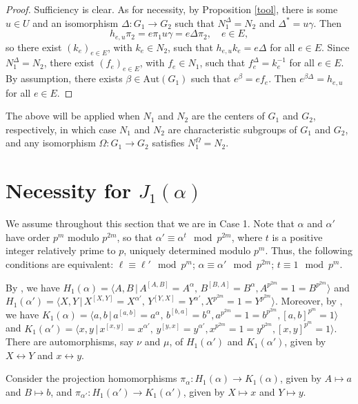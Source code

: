 \documentclass{amsart}
\theoremstyle{definition}
\theoremstyle{remark}
\begin{document}
\begin{proof} Sufficiency is clear. As for necessity, by Proposition \ref{tool}, there is some $u\in U$
and an isomorphism $\Delta:G_1\to G_2$ such that $N_1^\Delta=N_2$ and $\Delta^*=u\gamma$. Then
$$
h_{e,u}\pi_2=e \pi_1 u\gamma=e\Delta\pi_2,\quad e\in E,
$$
so there exist $(k_e)_{e\in E}$, with $k_e\in N_2$, such that $h_{e,u}k_e=e\Delta$ for all $e\in E$. Since $N_1^\Delta=N_2$,
there exist $(f_e)_{e\in E}$, with $f_e\in N_1$, such that $f_e^\Delta=k_e^{-1}$ for all $e\in E$. By assumption, there
exists $\beta\in \mathrm{Aut}(G_1)$ such that $e^\beta=e f_e$. Then $e^{\beta\Delta}=h_{e,u}$ for all $e\in E$.
\end{proof}


The above will be applied when $N_1$ and $N_2$ are the centers of $G_1$ and $G_2$, respectively,
in which case $N_1$ and $N_2$ are characteristic subgroups of $G_1$ and $G_2$, and any isomorphism
$\Omega:G_1\to G_2$ satisfies $N_1^\Omega=N_2$.


\section{Necessity for $J_1(\alpha)$}\label{caso1}

We assume throughout this section that we are in Case 1.
Note that $\alpha$ and $\alpha'$ have order $p^m$ modulo $p^{2m}$, so that
$\alpha'\equiv\alpha^t\mod p^{2m}$, where $t$ is a positive integer relatively prime to $p$, uniquely
determined modulo $p^{m}$. Thus, the following conditions are equivalent: $\ell\equiv \ell'\mod p^m$;
$\alpha\equiv\alpha'\mod p^{2m}$; $t\equiv 1\mod p^m$.

By \cite[Section 3]{MS2}, we have $H_1(\alpha)=\langle A,B\,|\, A^{[A,B]}=A^\alpha,\, B^{[B,A]}=B^\alpha, A^{p^{2m}}=1=B^{p^{2m}}\rangle$
and
$
H_1(\alpha')=\langle X,Y\,|\, X^{[X,Y]}=X^{\alpha'},\, Y^{[Y,X]}=Y^{\alpha'},  X^{p^{2m}}=1=Y^{p^{2m}}\rangle.
$
Moreover, by \cite[Section 2]{MS2}, we have
$
K_1(\alpha)=\langle a,b\,|\, a^{[a,b]}=a^\alpha,\, b^{[b,a]}=b^\alpha, a^{p^{2m}}=1=b^{p^{2m}}, [a,b]^{p^{m}}=1\rangle
$
and
$
K_1(\alpha')=\langle x,y\,|\, x^{[x,y]}=x^{\alpha'},\, y^{[y,x]}=y^{\alpha'},  x^{p^{2m}}=1=y^{p^{2m}},[x,y]^{p^{m}}=1\rangle.
$
There are automorphisms, say $\nu$ and $\mu$, of $H_1(\alpha')$ and $K_1(\alpha')$, given by $X\leftrightarrow Y$
and $x\leftrightarrow y$.

Consider the projection homomorphisms $\pi_\alpha:H_1(\alpha)\to K_1(\alpha)$, given by $A\mapsto a$ and $B\mapsto b$,
and $\pi_{\alpha'}:H_1(\alpha')\to K_1(\alpha')$, given by $X\mapsto x$ and $Y\mapsto y$.
\end{document}
